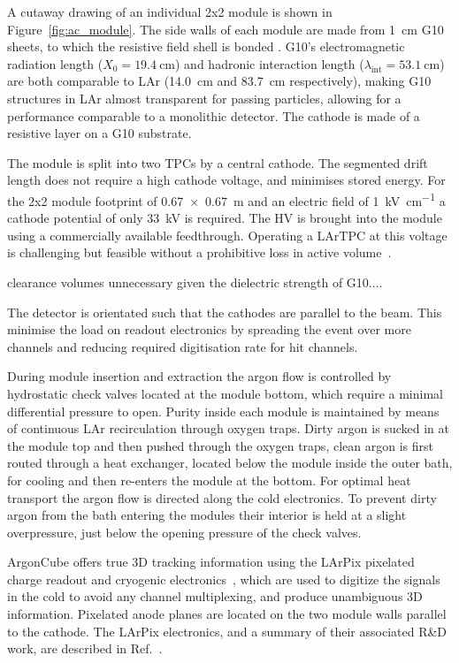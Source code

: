 A cutaway drawing of an individual 2x2 module is shown in Figure~\ref{fig:ac_module}. The side walls of each module are made from \SI{1}{\centi\metre} G10 sheets, to which the resistive field shell is bonded . G10's electromagnetic radiation length ($X_{\mathrm{0}} = \SI{19.4}{\centi\metre}$) and hadronic interaction length ($\lambda_{\mathrm{int}} = \SI{53.1}{\centi\metre}$)~\cite{pdg_g10} are both comparable to LAr (14.0~cm and 83.7~cm respectively), making G10 structures in LAr almost transparent for passing particles, allowing for a performance comparable to a monolithic detector. The cathode is made of a resistive layer on a G10 substrate.

The module is split into two TPCs by a central cathode. The segmented drift length does not require a high cathode voltage, and minimises stored energy. For the 2x2 module footprint of \SI{0.67 x 0.67}{\metre} and an electric field of \SI{1}{\kilo\volt\per\centi\metre} a cathode potential of only \SI{33}{\kilo\volt} is required. The HV is brought into the module using a commercially available feedthrough. Operating a LArTPC at this voltage is challenging but feasible without a prohibitive loss in active volume~\cite{argontube}.

clearance volumes unnecessary given the dielectric strength of G10.... 

The detector is orientated such that the cathodes are parallel to the beam. This minimise the load on readout electronics by spreading the event over more channels and reducing required digitisation rate for hit channels.


During module insertion and extraction the argon flow is controlled by hydrostatic check valves located at the module bottom, which require a minimal differential pressure to open. Purity inside each module is maintained by means of continuous LAr recirculation through oxygen traps. Dirty argon is sucked in at the module top and then pushed through the oxygen traps, clean argon is first routed through a heat exchanger, located below the module inside the outer bath, for cooling and then re-enters the module at the bottom. For optimal heat transport the argon flow is directed along the cold electronics. To prevent dirty argon from the bath entering the modules their interior is held at a slight overpressure, just below the opening pressure of the check valves. 

ArgonCube offers true 3D tracking information using the LArPix pixelated charge readout and cryogenic electronics~\cite{larpix}, which are used to digitize the signals in the cold to avoid any channel multiplexing, and produce unambiguous 3D information. Pixelated anode planes are located on the two module walls parallel to the cathode.  The LArPix electronics, and a summary of their associated R\&D work, are described in Ref.~\cite{larpix}.

